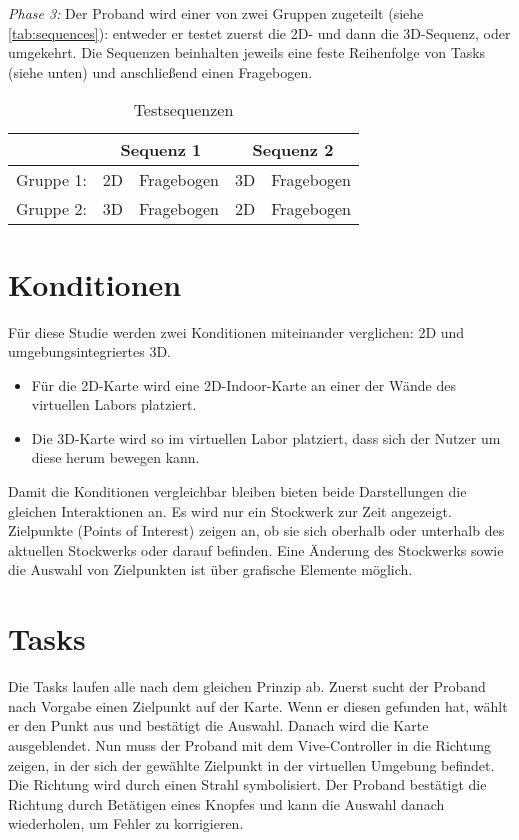 \documentclass[
    draft=false,
    paper=a4,
    fontsize=11pt,
    twoside=false,
    captions=tableheading,
    british, ngerman,
]{scrartcl}
\begin{document}
\vspace{1em}
\noindent
\textit{Phase 3:}
Der Proband wird einer von zwei Gruppen zugeteilt (siehe \autoref{tab:sequences}): entweder er testet zuerst die 2D- und dann die 3D-Sequenz, oder umgekehrt.
Die Sequenzen beinhalten jeweils eine feste Reihenfolge von Tasks (siehe unten) und anschließend einen Fragebogen.

\begin{table}[h]
    \label{tab:sequences}
    \centering
    \caption{Testsequenzen}
    \begin{tabular}{ccccc}
                  & \multicolumn{2}{c}{Sequenz 1} & \multicolumn{2}{c}{Sequenz 2} \\\toprule
        Gruppe 1: & 2D & Fragebogen & 3D & Fragebogen \\
        Gruppe 2: & 3D & Fragebogen & 2D & Fragebogen
    \end{tabular}
\end{table}

\section*{Konditionen}
Für diese Studie werden zwei Konditionen miteinander verglichen: 2D und umgebungsintegriertes 3D.
\begin{itemize}
    \item Für die 2D-Karte wird eine 2D-Indoor-Karte an einer der Wände des virtuellen Labors platziert.
    \item Die 3D-Karte wird so im virtuellen Labor platziert, dass sich der Nutzer um diese herum bewegen kann.
\end{itemize}
Damit die Konditionen vergleichbar bleiben bieten beide Darstellungen die gleichen Interaktionen an.
Es wird nur ein Stockwerk zur Zeit angezeigt.
Zielpunkte (Points of Interest) zeigen an, ob sie sich oberhalb oder unterhalb des aktuellen Stockwerks oder darauf befinden.
Eine Änderung des Stockwerks sowie die Auswahl von Zielpunkten ist über grafische Elemente möglich.

\section*{Tasks}
Die Tasks laufen alle nach dem gleichen Prinzip ab.
Zuerst sucht der Proband nach Vorgabe einen Zielpunkt auf der Karte.
Wenn er diesen gefunden hat, wählt er den Punkt aus und bestätigt die Auswahl.
Danach wird die Karte ausgeblendet.
Nun muss der Proband mit dem Vive-Controller in die Richtung zeigen, in der sich der gewählte Zielpunkt in der virtuellen Umgebung befindet.
Die Richtung wird durch einen Strahl symbolisiert.
Der Proband bestätigt die Richtung durch Betätigen eines Knopfes und kann die Auswahl danach wiederholen, um Fehler zu korrigieren.
\end{document}
